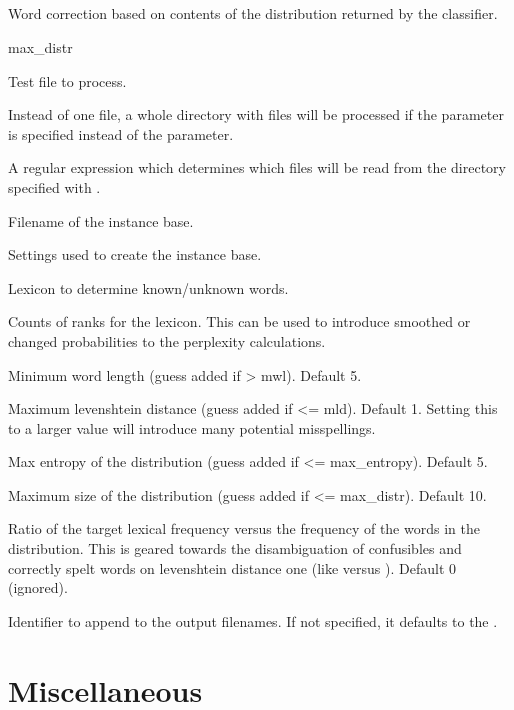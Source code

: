 \documentclass[a4paper,10pt,twoside]{report}
\begin{document}
\subsection{}

Word correction based on contents of the distribution returned by the
classifier.

\begin{varlist}{max\_distr}
\item[filename] Test file to process.
\item[dir] Instead of one file, a whole directory with files will be
  processed if the  parameter is specified instead of the
   parameter.
\item[dirmatch] A regular expression which determines which files will
  be read from the directory specified with .
\item[ibasefile] Filename of the instance base.
\item[timbl] Settings used to create the instance base.
\item[lexicon] Lexicon to determine known/unknown words.
\item[counts] Counts of ranks for the lexicon. This can be used to
  introduce smoothed or changed probabilities to the perplexity
  calculations. 
\item[mwl] Minimum word length (guess added if > mwl). Default 5.
\item[mld] Maximum levenshtein distance (guess added if <=
  mld). Default 1. Setting this to a larger value will introduce many
  potential misspellings.
\item[max\_ent] Max entropy of the distribution (guess added if <=
  max\_entropy). Default 5.
\item[max\_distr] Maximum size of the distribution (guess added if <=
  max\_distr). Default 10.
\item[min\_ratio] Ratio of the target lexical frequency versus the
  frequency of the words in the distribution. This is geared towards
  the disambiguation of confusibles and correctly spelt words on
  levenshtein distance one (like  versus
  ). Default 0 (ignored).
\item[id] Identifier to append to the output filenames. If not
  specified, it defaults to the \pid{}.
\end{varlist}


\section{Miscellaneous}
\end{document}
